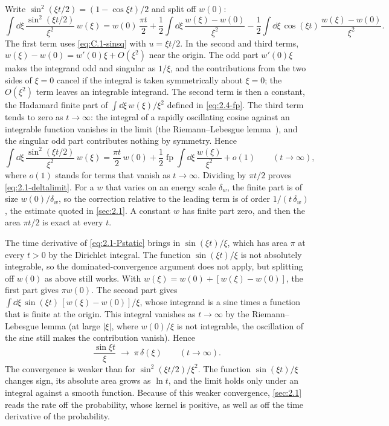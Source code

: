 Write $\sin^2(\xi t/2) = (1 - \cos\xi t)/2$ and split off $w(0)$:
\begin{equation*}
  \int\dd\xi\,\frac{\sin^2(\xi t/2)}{\xi^2}\,w(\xi)
  = w(0)\,\frac{\pi t}{2} + \frac12\int\dd\xi\,\frac{w(\xi) - w(0)}{\xi^2} - \frac12\int\dd\xi\,\cos(\xi t)\,\frac{w(\xi) - w(0)}{\xi^2} .
\end{equation*}
The first term uses \cref{eq:C.1-sinsq} with $u = \xi t/2$. In the second and third terms, $w(\xi) - w(0) = w'(0)\xi + O(\xi^2)$ near the origin. The odd part $w'(0)\xi$ makes the integrand odd and singular as $1/\xi$, and the contributions from the two sides of $\xi = 0$ cancel if the integral is taken symmetrically about $\xi = 0$; the $O(\xi^2)$ term leaves an integrable integrand. The second term is then a constant, the Hadamard finite part of $\int\dd\xi\,w(\xi)/\xi^2$ defined in \cref{eq:2.4-fp}. The third term tends to zero as $t \to \infty$: the integral of a rapidly oscillating cosine against an integrable function vanishes in the limit (the Riemann--Lebesgue lemma~\cite[Eq.~(1.8.10)]{olver2010nist}), and the singular odd part contributes nothing by symmetry. Hence
\begin{equation}
  \int\dd\xi\,\frac{\sin^2(\xi t/2)}{\xi^2}\,w(\xi) = \frac{\pi t}{2}\,w(0) + \frac12\operatorname{fp}\!\int\dd\xi\,\frac{w(\xi)}{\xi^2} + o(1) \qquad (t\to\infty),
  \label{eq:C.1-sincorr}
\end{equation}
where $o(1)$ stands for terms that vanish as $t\to\infty$. Dividing by $\pi t/2$ proves \cref{eq:2.1-deltalimit}. For a $w$ that varies on an energy scale $\delta_w$, the finite part is of size $w(0)/\delta_w$, so the correction relative to the leading term is of order $1/(t\,\delta_w)$, the estimate quoted in \cref{sec:2.1}. A constant $w$ has finite part zero, and then the area $\pi t/2$ is exact at every $t$.

The time derivative of \cref{eq:2.1-Pstatic} brings in $\sin(\xi t)/\xi$, which has area $\pi$ at every $t > 0$ by the Dirichlet integral. The function $\sin(\xi t)/\xi$ is not absolutely integrable, so the dominated-convergence argument does not apply, but splitting off $w(0)$ as above still works. With $w(\xi) = w(0) + [w(\xi) - w(0)]$, the first part gives $\pi w(0)$. The second part gives $\int\dd\xi\,\sin(\xi t)\,[w(\xi) - w(0)]/\xi$, whose integrand is a sine times a function that is finite at the origin. This integral vanishes as $t\to\infty$ by the Riemann--Lebesgue lemma (at large $|\xi|$, where $w(0)/\xi$ is not integrable, the oscillation of the sine still makes the contribution vanish). Hence
\begin{equation}
  \frac{\sin\xi t}{\xi} \;\longrightarrow\; \pi\,\delta(\xi) \qquad (t\to\infty) .
  \label{eq:C.1-sinc}
\end{equation}
The convergence is weaker than for $\sin^2(\xi t/2)/\xi^2$. The function $\sin(\xi t)/\xi$ changes sign, its absolute area grows as $\ln t$, and the limit holds only under an integral against a smooth function. Because of this weaker convergence, \cref{sec:2.1} reads the rate off the probability, whose kernel is positive, as well as off the time derivative of the probability.

